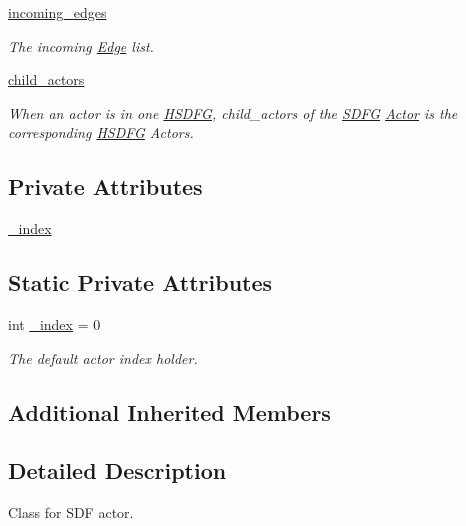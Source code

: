 \begin{DoxyCompactItemize}
\hyperlink{classsylva_1_1base_1_1sdf_1_1_actor_a369e42539c2f6dbefafd3ab543428404}{incoming\+\_\+edges}
\begin{DoxyCompactList}\small\item\em The incoming \hyperlink{classsylva_1_1base_1_1sdf_1_1_edge}{Edge} list. \end{DoxyCompactList}\item 
\hyperlink{classsylva_1_1base_1_1sdf_1_1_actor_a401878079b1860ed686c9e147f37a84b}{child\+\_\+actors}
\begin{DoxyCompactList}\small\item\em When an actor is in one \hyperlink{classsylva_1_1base_1_1sdf_1_1_h_s_d_f_g}{H\+S\+D\+FG}, child\+\_\+actors of the \hyperlink{classsylva_1_1base_1_1sdf_1_1_s_d_f_g}{S\+D\+FG} \hyperlink{classsylva_1_1base_1_1sdf_1_1_actor}{Actor} is the corresponding \hyperlink{classsylva_1_1base_1_1sdf_1_1_h_s_d_f_g}{H\+S\+D\+FG} Actors. \end{DoxyCompactList}\end{DoxyCompactItemize}
\subsection*{Private Attributes}
\begin{DoxyCompactItemize}
\item 
\hyperlink{classsylva_1_1base_1_1sdf_1_1_actor_a2b486ccde6c94e6bfdaa15b04ffe0da4}{\+\_\+index}
\end{DoxyCompactItemize}
\subsection*{Static Private Attributes}
\begin{DoxyCompactItemize}
\item 
int \hyperlink{classsylva_1_1base_1_1sdf_1_1_actor_a2b486ccde6c94e6bfdaa15b04ffe0da4}{\+\_\+index} = 0
\begin{DoxyCompactList}\small\item\em The default actor index holder. \end{DoxyCompactList}\end{DoxyCompactItemize}
\subsection*{Additional Inherited Members}


\subsection{Detailed Description}
Class for S\+DF actor. 



